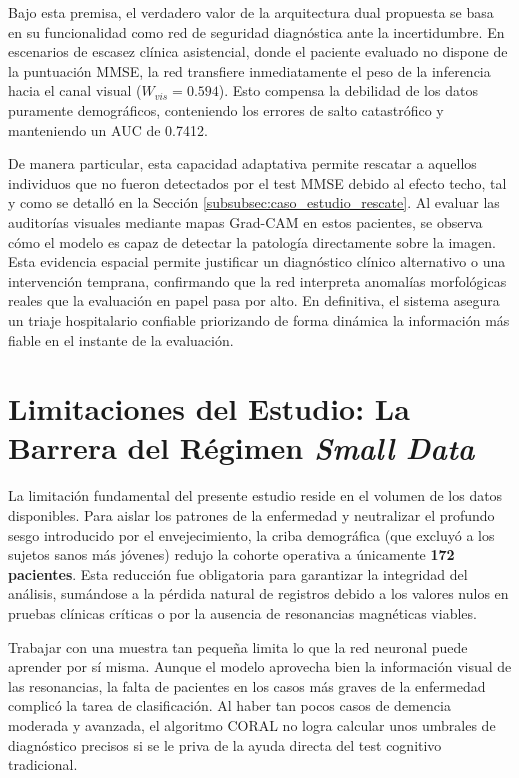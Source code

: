 \documentclass[12pt, oneside, english, spanish]{book}
\begin{document}
Bajo esta premisa, el verdadero valor de la arquitectura dual propuesta se basa en su funcionalidad como red de seguridad diagnóstica ante la incertidumbre. En escenarios de escasez clínica asistencial, donde el paciente evaluado no dispone de la puntuación MMSE, la red transfiere inmediatamente el peso de la inferencia hacia el canal visual ($W_{vis} = 0.594$). Esto compensa la debilidad de los datos puramente demográficos, conteniendo los errores de salto catastrófico y manteniendo un AUC de 0.7412. 

De manera particular, esta capacidad adaptativa permite rescatar a aquellos individuos que no fueron detectados por el test MMSE debido al efecto techo, tal y como se detalló en la Sección \ref{subsubsec:caso_estudio_rescate}. Al evaluar las auditorías visuales mediante mapas Grad-CAM en estos pacientes, se observa cómo el modelo es capaz de detectar la patología directamente sobre la imagen. Esta evidencia espacial permite justificar un diagnóstico clínico alternativo o una intervención temprana, confirmando que la red interpreta anomalías morfológicas reales que la evaluación en papel pasa por alto. En definitiva, el sistema asegura un triaje hospitalario confiable priorizando de forma dinámica la información más fiable en el instante de la evaluación.

\section{Limitaciones del Estudio: La Barrera del Régimen \textit{Small Data}} \label{sec:limitaciones_estudio}

La limitación fundamental del presente estudio reside en el volumen de los datos disponibles. Para aislar los patrones de la enfermedad y neutralizar el profundo sesgo introducido por el envejecimiento, la criba demográfica (que excluyó a los sujetos sanos más jóvenes) redujo la cohorte operativa a únicamente \textbf{172 pacientes}. Esta reducción fue obligatoria para garantizar la integridad del análisis, sumándose a la pérdida natural de registros debido a los valores nulos en pruebas clínicas críticas o por la ausencia de resonancias magnéticas viables.

Trabajar con una muestra tan pequeña limita lo que la red neuronal puede aprender por sí misma. Aunque el modelo aprovecha bien la información visual de las resonancias, la falta de pacientes en los casos más graves de la enfermedad complicó la tarea de clasificación. Al haber tan pocos casos de demencia moderada y avanzada, el algoritmo CORAL no logra calcular unos umbrales de diagnóstico precisos si se le priva de la ayuda directa del test cognitivo tradicional.
\end{document}
